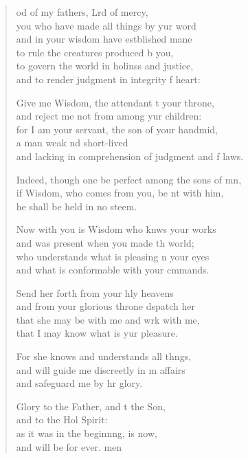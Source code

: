 \settowidth{\versewidth}{Indeed, though one be perfect among the sons of men, +}
\begin{verse}%
  \begin{patverse}
od of my fathers, Lrd of mercy,\Med\\
you who have made all things by yur word\\
and in your wisdom have estblished mane\Med\\
to rule the creatures produced b you,\\
to govern the world in holinss and justice,\Med\\
and to render judgment in integrity f heart:

Give me Wisdom, the attendant t your throne,\Med\\
and reject me not from among yur children:\\
for I am your servant, the son of your handmid,\Flex\\
a man weak nd short-lived\Med\\
and lacking in comprehension of judgment and f laws.

Indeed, though one be perfect among the sons of mn,\Flex\\
if Wisdom, who comes from you, be nt with him,\Med\\
he shall be held in no steem.

Now with you is Wisdom who knws your works\Med\\
and was present when you made th world;\\
who understands what is pleasing \pointup{\i}n your eyes\Med\\
and what is conformable with your cmmands.

Send her forth from your hly heavens\Med\\
and from your glorious throne d\pointup{\i}spatch her\\
that she may be with me and wrk with me,\Med\\
that I may know what is yur pleasure.

For she knows and understands all th\pointup{\i}ngs,\Flex\\
and will guide me discreetly in m affairs\Med\\
and safeguard me by hr glory.

Glory to the Father, and t the Son,\Med\\
and to the Hol Spirit:\\
as it was in the beginn\pointup{\i}ng, is now,\Med\\
and will be for ever. men
  \end{patverse}
\end{verse}
